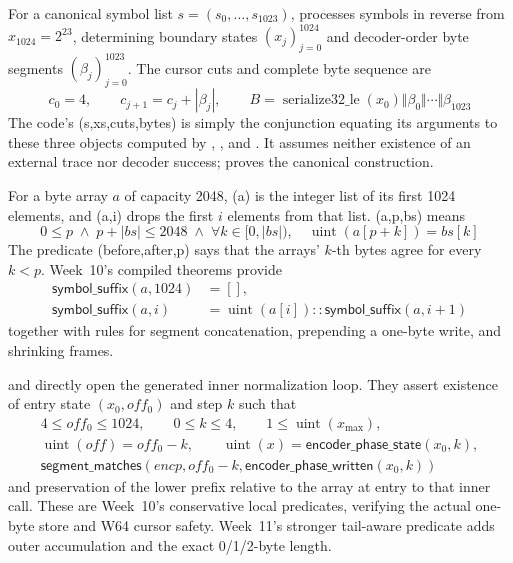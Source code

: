 \begin{definition}
\label{def:rans-byte-trace}
For a canonical symbol list \(s=(s_0,\ldots,s_{1023})\),
 processes symbols in reverse from \(x_{1024}=2^{23}\),
determining boundary states \((x_j)_{j=0}^{1024}\) and decoder-order byte
segments \((\beta_j)_{j=0}^{1023}\). The cursor cuts and complete byte sequence are
\[
  c_0=4,\qquad c_{j+1}=c_j+|\beta_j|,
  \qquad
  B=\operatorname{serialize32\_le}(x_0)
      \Vert\beta_0\Vert\cdots\Vert\beta_{1023}
\]
The code's (s,xs,cuts,bytes) is simply the
conjunction equating its arguments to these three objects computed by
, , and
. It assumes neither existence of an external trace
nor decoder success;  proves the
canonical construction.
\end{definition}

\begin{definition}
\label{def:rans-array-list-bridge}
For a byte array \(a\) of capacity 2048, (a)
is the integer list of its first 1024 elements, and
(a,i) drops the first \(i\) elements from that list.
(a,p,bs) means
\[
  0\le p\;\land\;p+|bs|\le2048\;\land\;
  \forall k\in[0,|bs|),\quad
  \operatorname{uint}(a[p+k])=bs[k]
\]
The predicate (before,after,p) says that the arrays'
\(k\)-th bytes agree for every \(k<p\). Week~10's compiled theorems provide
\[
\begin{aligned}
  \mathsf{symbol\_suffix}(a,1024)&=[],\\
  \mathsf{symbol\_suffix}(a,i)
    &=\operatorname{uint}(a[i])::\mathsf{symbol\_suffix}(a,i+1)
\end{aligned}
\]
together with rules for segment concatenation, prepending a one-byte write,
and shrinking frames.
\end{definition}

\begin{definition}
\label{def:rans-actual-inner}
 and
 directly open the generated
 inner normalization loop. They assert existence of
entry state \((x_0,off_0)\) and step \(k\) such that
\[
\begin{gathered}
  4\le off_0\le1024,\qquad 0\le k\le4,
  \qquad 1\le\operatorname{uint}(x_{\max}),\\
  \operatorname{uint}(off)=off_0-k,\qquad
  \operatorname{uint}(x)=\mathsf{encoder\_phase\_state}(x_0,k),\\
  \mathsf{segment\_matches}
    (encp,off_0-k,\mathsf{encoder\_phase\_written}(x_0,k))
\end{gathered}
\]
and preservation of the lower prefix relative to the array at entry to that
inner call. These are Week~10's conservative local predicates, verifying the
actual one-byte store and W64 cursor safety. Week~11's stronger tail-aware
predicate adds outer accumulation and the exact 0/1/2-byte length.
\end{definition}

